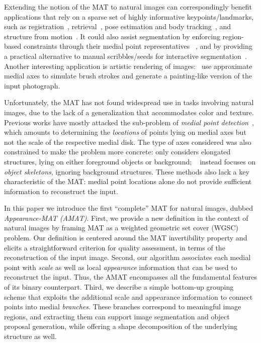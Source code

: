 \documentclass[10pt,twocolumn,letterpaper]{article}
\begin{document}
Extending the notion of the MAT to natural images can correspondingly benefit applications that rely on
a sparse set of highly informative keypoints/landmarks, such as registration~\cite{zhou2016estimating}, 
retrieval~\cite{sivic2003video}, pose estimation and body tracking~\cite{shotton2013efficient},
and structure from motion~\cite{agarwal2011building}.
It could also assist segmentation by enforcing region-based constraints through their medial point representatives
~\cite{teo2015detection}, and by providing a practical alternative to manual 
scribbles/seeds for interactive segmentation~\cite{boykov2001interactive,price2010geodesic,isack2016hedgehog,lin2016scribblesup}.
Another interesting application is artistic rendering of images:~\cite{gooch2002artistic} use approximate medial axes
to simulate brush strokes and generate a painting-like version of the input photograph.

Unfortunately, the MAT has not found widespread use in tasks 
involving natural images, due to the lack of a generalization that accommodates color and texture.
Previous works have mostly attacked the sub-problem of \emph{medial point detection}~\cite{tsogkas2012learning,shen2016object},
which amounts to determining the \emph{locations} of points lying on medial axes 
but not the scale of the respective medial disk.
The type of axes considered was also constrained to make the problem more concrete:
\cite{tsogkas2012learning} only considers elongated structures, lying on either foreground objects or background; 
~\cite{shen2016object} instead focuses on \emph{object skeletons}, ignoring background structures.
These methods also lack a key characteristic of the MAT: medial point locations alone do not provide sufficient
information to reconstruct the input.

In this paper we introduce the first ``complete'' MAT for natural images, dubbed \emph{Appearance-MAT (AMAT)}.
First, we provide a new definition in the context of natural images by framing MAT 
as a weighted geometric set cover (WGSC) problem.
Our definition is centered around the MAT invertibility property and elicits 
a straightforward criterion for quality assessment, in terms of the reconstruction of the input image.
Second, our algorithm associates each medial point with \emph{scale} as well as local \emph{appearance} information
that can be used to reconstruct the input.
Thus, the AMAT encompasses all the fundamental features of its  binary counterpart. 
Third, we describe a simple bottom-up grouping scheme that exploits the additional scale and appearance information to connect
points into medial \emph{branches}.
These branches correspond to meaningful image regions, and extracting them can support image segmentation
and object proposal generation, while offering a shape decomposition of the underlying structure as well. 
\end{document}
